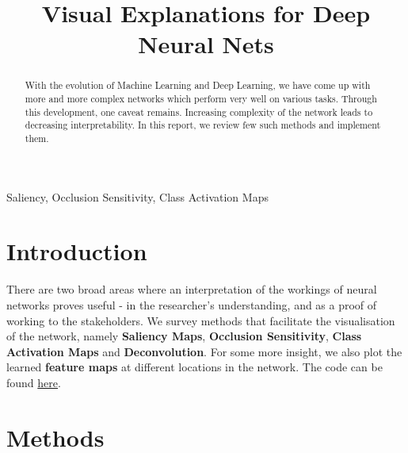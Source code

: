 \documentclass[conference]{IEEEtran}
\begin{document}
\title{Visual Explanations for Deep Neural Nets}

\author{
\and
{}
}

\maketitle

\begin{abstract}
With the evolution of Machine Learning and Deep Learning, we have come up with more and more complex networks which perform very well on various tasks. Through this development, one caveat remains. Increasing complexity of the network leads to decreasing interpretability. In this report, we review few such methods and implement them. 
\end{abstract}

\begin{IEEEkeywords}
Saliency, Occlusion Sensitivity, Class Activation Maps 
\end{IEEEkeywords}

\section{Introduction}
There are two broad areas where an interpretation of the workings of neural networks proves useful - in the researcher's understanding, and as a proof of working to the stakeholders. We survey methods that facilitate the visualisation of the network, namely \textbf{Saliency Maps}, \textbf{Occlusion Sensitivity}, \textbf{Class Activation Maps} and \textbf{Deconvolution}. For some more insight, we also plot the learned \textbf{feature maps} at different locations in the network. The code can be found \href{https://github.com/prateekgargX/Visualizing-Neural-Networks}{here}.
\section{Methods}



\end{document}
